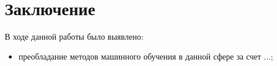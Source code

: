 \chapter{Заключение}

В ходе данной работы было выявлено:
\begin{itemize}
    \item преобладание методов машинного обучения в данной сфере за счет
        ...;
\end{itemize}
